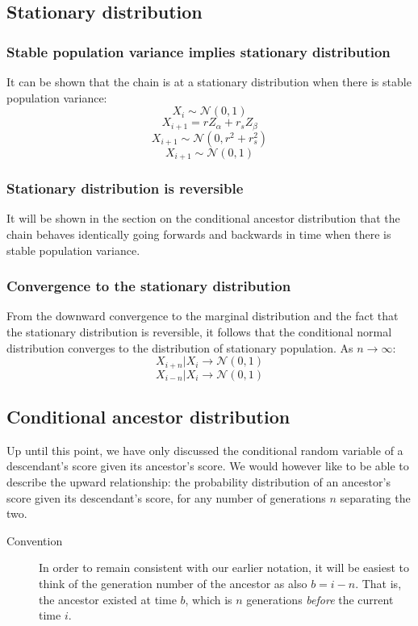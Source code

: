 \documentclass[letterpaper,10pt]{article} %
\begin{document}
\subsection{Stationary distribution}

\subsubsection*{Stable population variance implies stationary distribution}
It can be shown that the chain is at a stationary distribution when there is stable population variance:
$$X_i \sim \mathcal{N}(0, 1)$$
$$X_{i+1} = r Z_\alpha + r_s Z_\beta$$
$$X_{i+1} \sim \mathcal{N}(0, r^2+r_s^2)$$
$$X_{i+1} \sim \mathcal{N}(0, 1)$$

\subsubsection*{Stationary distribution is reversible}
It will be shown in the section on the conditional ancestor distribution that the chain behaves identically going forwards and backwards in time when there is stable population variance.

\subsubsection*{Convergence to the stationary distribution}

From the downward convergence to the marginal distribution and the fact that the stationary distribution is reversible, it follows that the conditional normal distribution converges to the distribution of stationary population. 
As $n \rightarrow \infty$:
$$X_{i+n}|X_i \rightarrow \mathcal{N}(0, 1)$$
$$X_{i-n}|X_i \rightarrow \mathcal{N}(0, 1)$$



\subsection{Conditional ancestor distribution}

Up until this point, we have only discussed the conditional random variable of a descendant's score given its ancestor's score. We would however like to be able to describe the upward relationship: the probability distribution of an ancestor's score given its descendant's score, for any number of generations $n$ separating the two. 

\begin{description}
\item [Convention] In order to remain consistent with our earlier notation, it will be easiest to think of the generation number of the ancestor as also $b = i - n$. That is, the ancestor existed at time $b$, which is $n$ generations \emph{before} the current time $i$. 
\end{description}
\end{document}
